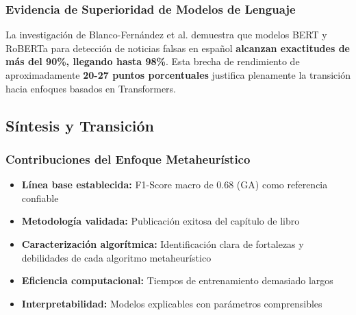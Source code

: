 \subsubsection{Evidencia de Superioridad de Modelos de Lenguaje}

La investigación de Blanco-Fernández et al. \cite{blanco2024enhancing} demuestra que modelos BERT y RoBERTa para detección de noticias falsas en español \textbf{alcanzan exactitudes de más del 90\%, llegando hasta 98\%}. Esta brecha de rendimiento de aproximadamente \textbf{20-27 puntos porcentuales} justifica plenamente la transición hacia enfoques basados en Transformers.

\begin{table}[htbp]
\centering
{}
\caption{Comparación de rendimiento entre enfoques metaheurísticos y modelos de lenguaje usando métricas macro.}
\label{tab:comparacion_enfoques}
\end{table}

\subsection{Síntesis y Transición}
\label{subsec:sintesis_transicion}

\subsubsection{Contribuciones del Enfoque Metaheurístico}

\begin{itemize}
    \item \textbf{Línea base establecida:} F1-Score macro de 0.68 (GA) como referencia confiable
    \item \textbf{Metodología validada:} Publicación exitosa del capítulo de libro \cite{hurtado2024calibracion}
    \item \textbf{Caracterización algorítmica:} Identificación clara de fortalezas y debilidades de cada algoritmo metaheurístico
    \item \textbf{Eficiencia computacional:} Tiempos de entrenamiento demasiado largos
    \item \textbf{Interpretabilidad:} Modelos explicables con parámetros comprensibles
\end{itemize}

